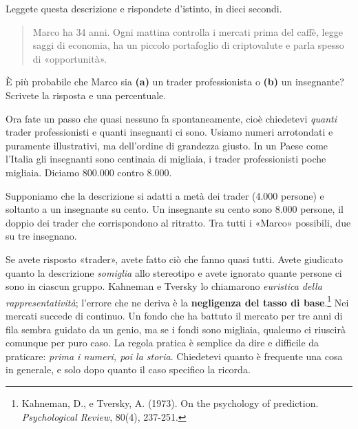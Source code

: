 \begin{provatu}
Leggete questa descrizione e rispondete d'istinto, in dieci secondi.

\begin{quote}
Marco ha 34 anni. Ogni mattina controlla i mercati prima del caffè, legge saggi di economia, ha un piccolo portafoglio di criptovalute e parla spesso di «opportunità».
\end{quote}

È più probabile che Marco sia \textbf{(a)} un trader professionista o \textbf{(b)} un insegnante? Scrivete la risposta e una percentuale.

Ora fate un passo che quasi nessuno fa spontaneamente, cioè chiedetevi \textit{quanti} trader professionisti e quanti insegnanti ci sono. Usiamo numeri arrotondati e puramente illustrativi, ma dell'ordine di grandezza giusto. In un Paese come l'Italia gli insegnanti sono centinaia di migliaia, i trader professionisti poche migliaia. Diciamo 800.000 contro 8.000.

Supponiamo che la descrizione si adatti a metà dei trader (4.000 persone) e soltanto a un insegnante su cento. Un insegnante su cento sono 8.000 persone, il doppio dei trader che corrispondono al ritratto. Tra tutti i «Marco» possibili, due su tre insegnano.

\spiegazione Se avete risposto «trader», avete fatto ciò che fanno quasi tutti. Avete giudicato quanto la descrizione \textit{somiglia} allo stereotipo e avete ignorato quante persone ci sono in ciascun gruppo. Kahneman e Tversky lo chiamarono \textit{euristica della rappresentatività}; l'errore che ne deriva è la \textbf{negligenza del tasso di base}.\footnote{Kahneman, D., e Tversky, A. (1973). On the psychology of prediction. \textit{Psychological Review}, 80(4), 237-251.} Nei mercati succede di continuo. Un fondo che ha battuto il mercato per tre anni di fila sembra guidato da un genio, ma se i fondi sono migliaia, qualcuno ci riuscirà comunque per puro caso. La regola pratica è semplice da dire e difficile da praticare: \textit{prima i numeri, poi la storia}. Chiedetevi quanto è frequente una cosa in generale, e solo dopo quanto il caso specifico la ricorda.
\end{provatu}


